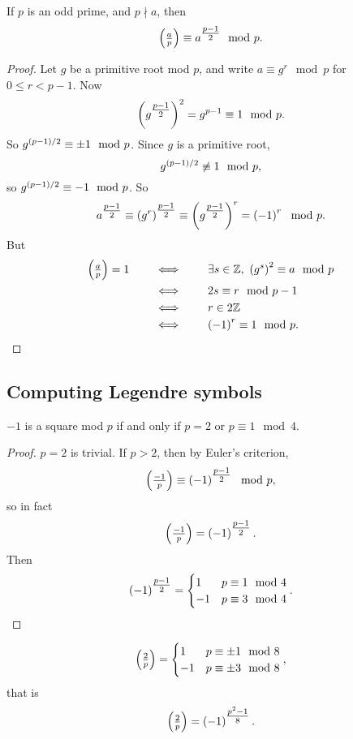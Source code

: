 \begin{theorem}
If $ p $ is an odd prime, and $ p \nmid a $, then
$$ \jacobi{a}{p} \equiv a^{\tfrac{p - 1}{2}} \mod p. $$
\end{theorem}

\begin{proof}
Let $ g $ be a primitive root mod $ p $, and write $ a \equiv g^r \mod p $ for $ 0 \le r < p - 1 $. Now
$$ \br{g^{\tfrac{p - 1}{2}}}^2 = g^{p - 1} \equiv 1 \mod p. $$
So $ g^{\br{p - 1} / 2} \equiv \pm 1 \mod p $. Since $ g $ is a primitive root,
$$ g^{\br{p - 1} / 2} \not\equiv 1 \mod p, $$
so $ g^{\br{p - 1} / 2} \equiv -1 \mod p $. So
$$ a^{\tfrac{p - 1}{2}} \equiv \br{g^r}^{\tfrac{p - 1}{2}} \equiv \br{g^{\tfrac{p - 1}{2}}}^r = \br{-1}^r \mod p. $$
But
\begin{align*}
\jacobi{a}{p} = 1 \qquad
& \iff \qquad \exists s \in \Z, \ \br{g^s}^2 \equiv a \mod p \\
& \iff \qquad 2s \equiv r \mod p - 1 \\
& \iff \qquad r \in 2\Z \\
& \iff \qquad \br{-1}^r \equiv 1 \mod p.
\end{align*}
\end{proof}

\subsection{Computing Legendre symbols}

\begin{proposition}
$ -1 $ is a square mod $ p $ if and only if $ p = 2 $ or $ p \equiv 1 \mod 4 $.
\end{proposition}

\begin{proof}
$ p = 2 $ is trivial. If $ p > 2 $, then by Euler's criterion,
$$ \jacobi{-1}{p} \equiv \br{-1}^{\tfrac{p - 1}{2}} \mod p, $$
so in fact
$$ \jacobi{-1}{p} = \br{-1}^{\tfrac{p - 1}{2}}. $$
Then
$$ \br{-1}^{\tfrac{p - 1}{2}} =
\begin{cases}
1 & p \equiv 1 \mod 4 \\
-1 & p \equiv 3 \mod 4
\end{cases}.
$$
\end{proof}

\begin{proposition}
$$ \jacobi{2}{p} =
\begin{cases}
1 & p \equiv \pm 1 \mod 8 \\
-1 & p \equiv \pm 3 \mod 8
\end{cases},
$$
that is
$$ \jacobi{2}{p} = \br{-1}^{\tfrac{p^2 - 1}{8}}. $$
\end{proposition}

